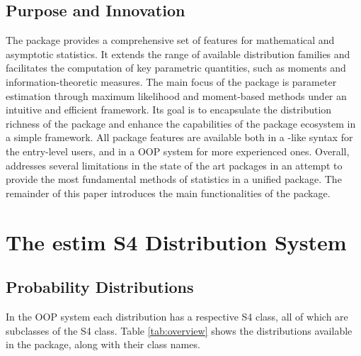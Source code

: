 \documentclass[nojss]{jss}
\begin{document}
\subsection[Purpose and Innovation]{Purpose and Innovation}\label{ss:innovation}

The  package provides a comprehensive set of features for mathematical and asymptotic statistics. It extends the range of available distribution families and facilitates the computation of key parametric quantities, such as moments and information-theoretic measures. The main focus of the package is parameter estimation through maximum likelihood and moment-based methods under an intuitive and efficient framework. Its goal is to encapsulate the distribution richness of the  package and enhance the capabilities of the  package ecosystem in a simple framework. All package features are available both in a -like syntax for the entry-level users, and in a OOP system for more experienced ones. Overall,  addresses several limitations in the state of the art  packages in an attempt to provide the most fundamental methods of statistics in a unified package. The remainder of this paper introduces the main functionalities of the package.

\section[The estim S4 Distribution System]{The estim S4 Distribution System} \label{s:distr}

\subsection[Probability Distributions]{Probability Distributions} \label{s:dpqr}

In the  OOP system each distribution has a respective S4 class, all of which are subclasses of the  S4 class. Table \ref{tab:overview} shows the distributions available in the package, along with their class names.
\end{document}
